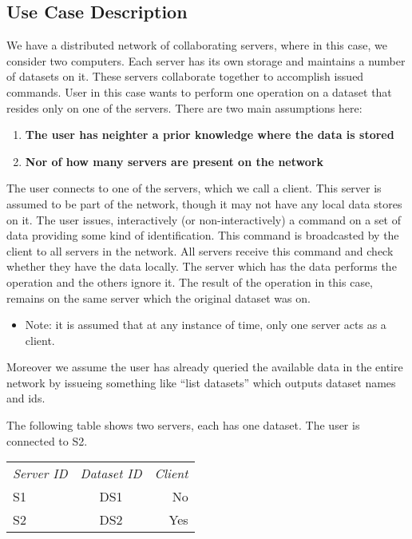 \subsection{Use Case Description}
We have a distributed network of collaborating servers, where in this case, we consider two computers. 
Each server has its own storage and maintains a number of datasets on it. These servers collaborate 
together to accomplish issued commands. User in this case wants to perform one operation on a dataset
that resides only on one of the servers. There are two main assumptions here:
\begin{enumerate}
\item \textbf{The user has neighter a prior knowledge where the data is stored}
\item \textbf{Nor of how many servers are present on the network}
\end{enumerate}

The user connects to one of the servers, which we call a client. This server is assumed to be part 
of the network, though it may not have any local data stores on it. The user issues, interactively
(or non-interactively) a command on a set of data providing some kind of identification. This command
is broadcasted by the client to all servers in the network. All servers receive this command and check
whether they have the data locally. The server which has the data performs the operation and the others
ignore it. The result of the operation in this case, remains on the same server which the original 
dataset was on. 

\begin{itemize}
\item Note: it is assumed that at any instance of time, only one server acts as a client.
\end{itemize}

Moreover we assume the user has already queried the available data in the entire network by 
issueing something like “list datasets” which outputs dataset names and ids.

The following table shows two servers, each has one dataset. The user is connected to S2.\\

\begin{tabular}{ l c r }
\em{Server ID} & \em{ Dataset ID} & \em{ Client} \\
S1 & DS1 & No \\
S2 & DS2 & Yes \\
\end{tabular}\\

